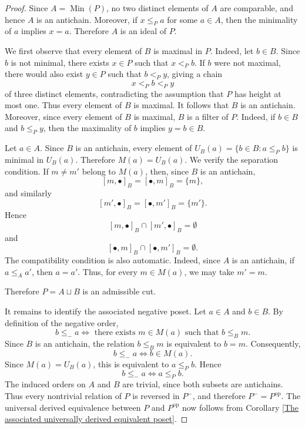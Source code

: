 \begin{proof}
    Since $A=\operatorname{Min}(P)$, no two distinct elements of $A$ are comparable, and hence $A$ is an antichain. Moreover, if $x \leq_Pa$ for some $a \in A$, then the minimality of $a$ implies $x=a$. Therefore $A$ is an ideal of $P$.

    We first observe that every element of $B$ is maximal in $P$. Indeed, let $b \in B$. Since $b$ is not minimal, there exists $x \in P$ such that $x<_Pb$. If $b$ were not maximal, there would also exist $y \in P$ such that $b <_Py$, giving a chain 
    \[x<_Pb<_Py\] of three distinct elements, contradicting the assumption that $P$ has height at most one. Thus every element of $B$ is maximal. It follows that $B$ is an antichain. Moreover, since every element of $B$ is maximal, $B$ is a filter of $P$. Indeed, if $b \in B$ and $b \leq_Py$, then the maximality of $b$ implies $y=b\in B$.

    Let $a \in A$. Since $B$ is an antichain, every element of $U_B(a)=\{b \in B \colon a \leq_Pb\}$ is minimal in $U_B(a)$. Therefore $M(a)=U_B(a)$. We verify the separation condition. If $m \neq m'$ belong to $M(a)$, then, since $B$ is an antichain, 
    \[[m, \bullet]_B =[\bullet, m]_B=\{m\},\] and similarly
    \[[m', \bullet]_B=[\bullet,m']_B=\{m'\}.\] Hence \[[m, \bullet]_B \cap [m', \bullet]_B= \emptyset\] and \[[\bullet, m]_B \cap [\bullet, m']_B=\emptyset.\] The compatibility condition is also automatic. Indeed, since $A$ is an antichain, if $a \leq_Aa'$, then $a=a'$. Thus, for every $m \in M(a)$, we may take $m'=m$.

    Therefore $P=A \sqcup B$ is an admissible cut.

    It remains to identify the associated negative poset. Let $a \in A$ and $b \in B$. By definition of the negative order,
    \[b \leq_-a \iff \text{ there exists } m \in M(a) \text{ such that } b \leq_Bm.\]
    Since $B$ is an antichain, the relation $b \leq_Bm$ is equivalent to $b=m$. Consequently, 
    \[b \leq_-a \iff b \in M(a).\]
    Since $M(a)=U_B(a)$, this is equivalent to $a \leq_Pb.$
    Hence \[b \leq_-a \iff a \leq_Pb.\]
    The induced orders on $A$ and $B$ are trivial, since both subsets are antichains. 
    Thus every nontrivial relation of $P$ is reversed in $P^-$, and therefore $P^-=P^{\operatorname{op}}$. 
     The universal derived equivalence between $P$ and $P^{\operatorname{op}}$ now follows from Corollary \ref{The associated universally derived equivalent poset}.
\end{proof}

